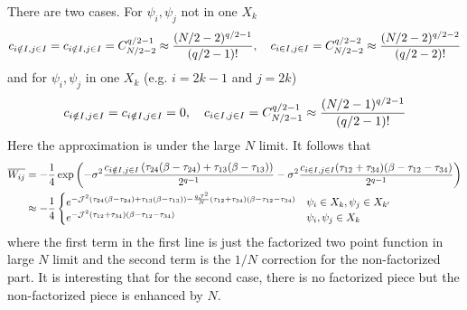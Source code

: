 \documentclass[11pt]{article}
\renewcommand{\>}{\rangle}
\newcommand{\<}{\langle}
\begin{document}
There are two cases. For $\psi_{i},\psi_{j}$ not in one $X_{k}$
\begin{equation}
c_{i\notin I,j\in I}=c_{i\notin I,j\in I}=C_{N/2-2}^{q/2-1}\approx\frac{(N/2-2)^{q/2-1}}{(q/2-1)!},\quad c_{i\in I,j\in I}=C_{N/2-2}^{q/2-2}\approx\frac{(N/2-2)^{q/2-2}}{(q/2-2)!}
\end{equation}
and for $\psi_{i},\psi_{j}$ in one $X_{k}$ (e.g. $i=2k-1$ and $j=2k$)
\begin{equation}
c_{i\notin I,j\in I}=c_{i\notin I,j\in I}=0,\quad c_{i\in I,j\in I}=C_{N/2-1}^{q/2-1}\approx\frac{(N/2-1)^{q/2-1}}{(q/2-1)!}
\end{equation}
Here the approximation is under the large $N$ limit. It follows that
\begin{align}
\overline{W_{ij}} & =-\frac{1}{4}\exp\left(-\sigma^{2}\frac{c_{i\notin I,j\in I}\left(\tau_{24}(\beta-\tau_{24})+\tau_{13}(\beta-\tau_{13})\right)}{2^{q-1}}-\sigma^{2}\frac{c_{i\in I,j\in I}(\tau_{12}+\tau_{34})(\beta-\tau_{12}-\tau_{34})}{2^{q-1}}\right)\nonumber \\
 & \approx-\frac{1}{4}\begin{cases}
e^{-\mathcal{J}^{2}\left(\tau_{24}(\beta-\tau_{24})+\tau_{13}(\beta-\tau_{13})\right)-\frac{q\mathcal{J}^{2}}{N}(\tau_{12}+\tau_{34})(\beta-\tau_{12}-\tau_{34})} & \psi_{i}\in X_{k},\psi_{j}\in X_{k'}\\
e^{-\mathcal{J}^{2}(\tau_{12}+\tau_{34})(\beta-\tau_{12}-\tau_{34})} & \psi_{i},\psi_{j}\in X_{k}
\end{cases}
\end{align}
where the first term in the first line is just the factorized two
point function in large $N$ limit and the second term is the $1/N$
correction for the non-factorized part. It is interesting that for the second case, there is no factorized piece but the non-factorized piece is enhanced by $N$.
\end{document}
